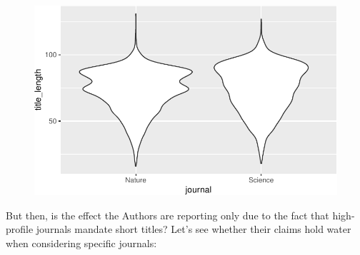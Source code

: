 \documentclass[
  letterpaper,
  DIV=11,
  numbers=noendperiod]{scrreprt}
\begin{document}
\begin{figure}[H]

{\centering \includegraphics{./10-model_selection_files/figure-pdf/unnamed-chunk-36-1.pdf}

}

\end{figure}

But then, is the effect the Authors are reporting only due to the fact
that high-profile journals mandate short titles? Let's see whether their
claims hold water when considering specific journals:
\end{document}
